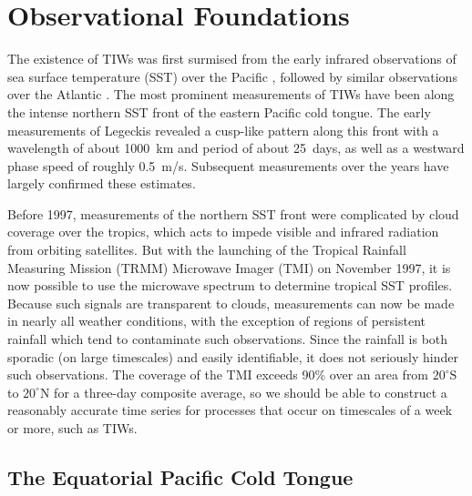 \documentclass[letterpaper, 11pt, onecolumn]{article}
\newcommand{\degree}{^{\circ}} \newcommand{\abs}[1]{\lvert#1\rvert}
\begin{document}
\section{Observational Foundations}

The existence of TIWs was first surmised from the early infrared observations
of sea surface temperature (SST) over the Pacific \citep{Legeckis:1977},
followed by similar observations over the Atlantic
\citep{Legeckis-Reverdin:1987}. The most prominent measurements of TIWs have
been along the intense northern SST front of the eastern Pacific cold tongue.
The early measurements of Legeckis revealed a cusp-like pattern along this
front with a wavelength of about 1000~km and period of about 25~days, as well
as a westward phase speed of roughly 0.5~m/s. Subsequent measurements over the
years have largely confirmed these estimates.

Before 1997, measurements of the northern SST front were complicated by cloud
coverage over the tropics, which acts to impede visible and infrared radiation
from orbiting satellites. But with the launching of the Tropical Rainfall
Measuring Mission (TRMM) Microwave Imager (TMI) on November 1997, it is now
possible to use the microwave spectrum to determine tropical SST profiles.
Because such signals are transparent to clouds, measurements can now be made in
nearly all weather conditions, with the exception of regions of persistent
rainfall which tend to contaminate such observations. Since the rainfall is
both sporadic (on large timescales) and easily identifiable, it does not
seriously hinder such observations. The coverage of the TMI exceeds 90\% over
an area from $20\degree\text{S}$ to $20\degree\text{N}$ for a three-day
composite average, so we should be able to construct a reasonably accurate time
series for processes that occur on timescales of a week or more, such as TIWs.

\subsection{The Equatorial Pacific Cold Tongue}

\end{document}
